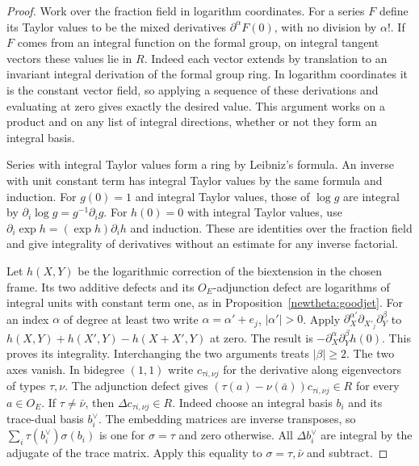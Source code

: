\begin{proof}
Work over the fraction field in logarithm coordinates. For a series
\(F\) define its Taylor values to be the mixed derivatives
\(\partial^\alpha F(0)\), with no division by \(\alpha!\).
If \(F\) comes from an integral function on the formal group,
on integral tangent vectors these values lie in \(R\). Indeed
each vector extends by translation to an invariant integral
derivation of the formal group ring. In logarithm coordinates it
is the constant vector field, so applying a sequence of these
derivations and evaluating at zero gives exactly the desired value.
This argument works on a product and on any list of integral
directions, whether or not they form an integral basis.

Series with integral Taylor values form a ring by Leibniz's formula.
An inverse with unit constant term has integral Taylor values by the
same formula and induction. For \(g(0)=1\) and integral Taylor
values, those of \(\log g\) are integral by
\(\partial_i\log g=g^{-1}\partial_i g\). For \(h(0)=0\) with
integral Taylor values, use
\(\partial_i\exp h=(\exp h)\partial_i h\) and induction.
These are identities over the fraction field and give integrality
of derivatives without an estimate for any inverse factorial.

Let \(h(X,Y)\) be the logarithmic correction of the biextension in
the chosen frame. Its two additive defects and its \(O_E\)-adjunction
defect are logarithms of integral units with constant term one, as
in Proposition~\ref{newtheta:goodjet}. For an index \(\alpha\) of
degree at least two write \(\alpha=\alpha'+e_j\), \(|\alpha'|>0\).
Apply \(\partial_X^{\alpha'}\partial_{X'_j}\partial_Y^\beta\) to
\(h(X,Y)+h(X',Y)-h(X+X',Y)\) at zero. The result is
\(-\partial_X^\alpha\partial_Y^\beta h(0)\). This proves its
integrality. Interchanging the two arguments treats \(|\beta|\ge2\).
The two axes vanish. In bidegree \((1,1)\) write \(c_{\tau i,\nu j}\)
for the derivative along eigenvectors of types \(\tau,\nu\).
The adjunction defect gives
\((\tau(a)-\nu(\bar a))c_{\tau i,\nu j}\in R\) for every \(a\in O_E\).
If \(\tau\ne\bar\nu\), then \(\Delta c_{\tau i,\nu j}\in R\).
Indeed choose an integral basis \(b_i\) and its trace-dual basis
\(b_i^\vee\). The embedding matrices are inverse transposes, so
\(\sum_i\tau(b_i^\vee)\sigma(b_i)\) is one for \(\sigma=\tau\)
and zero otherwise. All \(\Delta b_i^\vee\) are integral by the
adjugate of the trace matrix. Apply this equality to
\(\sigma=\tau,\bar\nu\) and subtract.


\end{proof}
